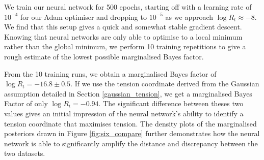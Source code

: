 \documentclass[%
 reprint,
 amsmath,amssymb,
 aps,
]{revtex4-2}
\begin{document}
We train our neural network for 500 epochs, starting off with a learning rate of $10^{-4}$ for our Adam optimiser and dropping to $10^{-5}$ as we approach $\log R_t \approx -8$. We find that this setup gives a quick and somewhat stable gradient descent. Knowing that neural networks are only able to optimise to a local minimum rather than the global minimum, we perform 10 training repetitions to give a rough estimate of the lowest possible marginalised Bayes factor. 

From the 10 training runs, we obtain a marginalised Bayes factor of $\log R_t = -16.8 \pm 0.5$. If we use the tension coordinate derived from the Gaussian assumption detailed in Section \ref{gaussian_tension}, we get a marginalised Bayes Factor of only $\log R_t = -0.94$. The significant difference between theses two values gives an initial impression of the neural network's ability to identify a tension coordinate that maximises tension. The density plots of the marginalised posteriors drawn in Figure \ref{fig:six_compare} further demonstrates how the neural network is able to significantly amplify the distance and discrepancy between the two datasets.
\end{document}
